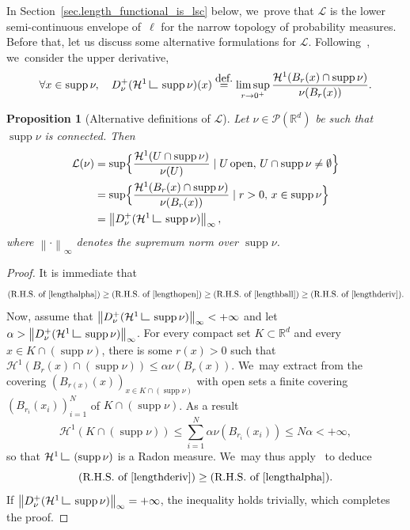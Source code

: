 \documentclass[11pt]{article}
\numberwithin{equation}{section}
\newtheorem{proposition}[theorem]{Proposition}
\theoremstyle{definition}
\newcommand{\eqdef}{\ensuremath{\stackrel{\mbox{\upshape\tiny def.}}{=}}}
\newcommand{\norm}[1]{\left\lVert#1\right\rVert}
\newcommand\LM[1]{\hbox{\vrule width.5pt \vbox to#1pt{\vfill \hrule width#1pt height.5pt}}}
\newcommand\LL{{\mathchoice {\>\LM7\>}{\>\LM7\>}{\,\LM5\,}{\,\LM{3.35}\,}}}
\newcommand{\mres}{\LL}
\newcommand\cH{\mathcal{H}}
\newcommand{\RR}{\mathbb{R}}
\DeclareMathOperator{\supp}{supp}
\newcommand{\Benscond}[2]{\Bigl\{#1 \mid #2\Bigr\} }
\begin{document}
In Section~\ref{sec.length_functional_is_lsc} below, we~prove that $\mathcal{L}$ is the lower semi-continuous envelope of~$\ell$ for the narrow topology of probability measures. Before that, let us discuss some alternative formulations for $\mathcal{L}$. Following~\cite[\S 2.4]{ambrosio2000functions}, we~consider the upper derivative,
\begin{equation}
\forall x \in \supp\nu,\quad D^+_\nu(\cH^1\mres \supp\nu)(x) \eqdef \limsup_{r\to 0^+} \frac{\cH^1(B_r(x)\cap \supp \nu)}{\nu(B_r(x))}.
\end{equation}

\begin{proposition}[Alternative definitions of $\mathcal{L}$]
Let $\nu \in \mathcal{P}(\RR^d)$ be such that $\supp \nu$ is connected. Then
\begin{align}
\mathcal{L}(\nu) &=\sup \Benscond{\frac{\cH^1(U \cap \supp \nu)}{\nu(U)}}{U \,\text{open},\, U\cap \supp \nu\neq \emptyset}\label{lengthopen}\\
&=\sup \Benscond{\frac{\cH^1(B_r(x)\cap \supp \nu)}{\nu(B_r(x))}}{r>0,\, x \in \supp \nu} \label{lengthball}\\
&= \norm{D^+_\nu(\cH^1\mres \supp\nu)}_{\infty},\label{lengthderiv}
\end{align}
where $\norm{\cdot}_\infty$ denotes the supremum norm over $\supp \nu$.
\end{proposition}

\begin{proof}
It is immediate that
\begin{equation*}
\left(\mbox{R.H.S. of \eqref{lengthalpha}}\right)\geq \left(\mbox{R.H.S. of \eqref{lengthopen}}\right)\geq \left(\mbox{R.H.S. of \eqref{lengthball}}\right)\geq(\mbox{R.H.S. of \eqref{lengthderiv}}).
\end{equation*}
Now, assume that $\norm{D^+_\nu(\cH^1\mres \supp\nu)}_{\infty}<+\infty$ and let $\alpha > \norm{D^+_\nu(\cH^1\mres \supp\nu)}_{\infty}$. For every compact set $K \subset \RR^d$ and every $x \in K\cap \left(\supp \nu\right)$, there is some $r(x)>0$ such that $\cH^1\left(B_r(x)\cap \left(\supp \nu\right)\right)\leq \alpha \nu(B_r(x))$. We~may extract from the covering $(B_{r(x)}(x))_{x \in K\cap \left(\supp\nu\right)}$ with open sets a finite covering $(B_{r_i}(x_i))_{i=1}^{N}$ of $K\cap \left(\supp \nu\right)$. As a result
\begin{equation*}
\cH^1(K\cap \left(\supp\nu\right))\leq \sum_{i=1}^{N} \alpha \nu(B_{r_i}(x_i))\leq N\alpha<+\infty,
\end{equation*}
so that $\cH^1\mres\left(\supp\nu\right)$ is a Radon measure. We~may thus apply~\cite[Prop.\,2.21]{ambrosio2000functions} to deduce
\begin{equation*}
\left(\mbox{R.H.S. of \eqref{lengthderiv}}\right)\geq(\mbox{R.H.S. of \eqref{lengthalpha}}).
\end{equation*}
If $\norm{D^+_\nu(\cH^1\mres \supp\nu)}_{\infty}=+\infty$, the inequality holds trivially, which completes the proof.
\end{proof}
\end{document}
